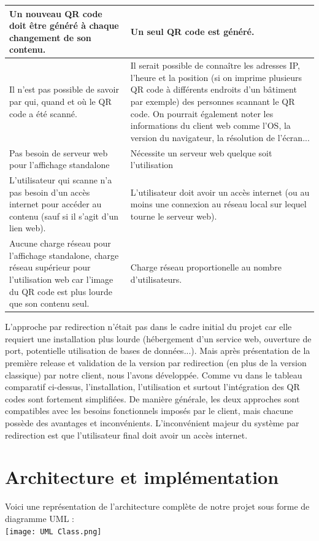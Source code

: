 \documentclass[a4paper,12pt]{article}
\begin{document}
\begin{longtable}{ | m{} | m{} | }
    \hline
    Un nouveau QR code doit être généré à chaque changement de son contenu. & Un seul QR code est généré.\\
    \hline
    Il n'est pas possible de savoir par qui, quand et où le QR code a été scanné. & Il serait possible de connaître les adresses IP, l'heure et la position (si on imprime plusieurs QR code à différents endroits d'un bâtiment par exemple) des personnes scannant le QR code. On pourrait également noter les informations du client web comme l'OS, la version du navigateur, la résolution de l'écran...\\
    \hline
    Pas besoin de serveur web pour l'affichage standalone & Nécessite un serveur web quelque soit l'utilisation \\ 
    \hline
    L'utilisateur qui scanne n'a pas besoin d'un accès internet pour accéder au contenu (sauf si il s'agit d'un lien web). &  L'utilisateur doit avoir un accès internet (ou au moins une connexion au réseau local sur lequel tourne le serveur web).\\ 
    \hline
    Aucune charge réseau pour l'affichage standalone, charge réseau supérieur pour l'utilisation web car l'image du QR code est plus lourde que son contenu seul. & Charge réseau proportionelle au nombre d'utilisateurs.\\
    \hline
    \end{longtable}

\bigskip
\newpage
\noindent L'approche par redirection n'était pas dans le cadre initial du projet car elle requiert une installation plus lourde (hébergement d'un service web, ouverture de port, potentielle utilisation de bases de données...). Mais après présentation de la première release et validation de la version par redirection (en plus de la version classique) par notre client, nous l'avons développée. Comme vu dans le tableau comparatif ci-dessus, l'installation, l'utilisation et surtout l'intégration des QR codes sont fortement simplifiées. De manière générale, les deux approches sont compatibles avec les besoins fonctionnels imposés par le client, mais chacune possède des avantages et inconvénients. L'inconvénient majeur du système par redirection est que l'utilisateur final doit avoir un accès internet.\\


\section{Architecture et implémentation}
\noindent Voici une représentation de l'architecture complète de notre projet sous forme de diagramme UML :\\
\noindent\texttt{[image: UML Class.png]} %
\end{document}
